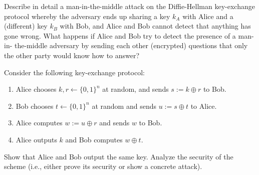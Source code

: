 \documentclass[a4paper,10pt,landscape,twocolumn]{scrartcl}
\begin{document}
\begin{exercise}
Describe in detail a man-in-the-middle attack on the Diffie-Hellman key-exchange protocol whereby the adversary ends up sharing a key $k_A$ with Alice and a (different) key $k_B$ with Bob, and Alice and Bob cannot detect that anything has gone wrong.
What happens if Alice and Bob try to detect the presence of a man-in- the-middle adversary by sending each other (encrypted) questions that only the other party would know how to answer?
\end{exercise}

\begin{exercise}
  Consider the following key-exchange protocol:
\begin{enumerate}
\item Alice chooses $k,r \leftarrow \{0,1\}^n$ at random, and sends $s := k \oplus r$ to Bob.
\item Bob chooses $t\leftarrow \{0,1\}^n$ at random and sends
  $u:=s \oplus t$ to Alice.
\item Alice computes $w := u \oplus r$ and sends $w$ to Bob.
\item Alice outputs $k$ and Bob computes $w \oplus t$.
\end{enumerate}
Show that Alice and Bob output the same key. Analyze the security of
the scheme (i.e., either prove its security or show a concrete
attack).
\end{exercise}
\end{document}
